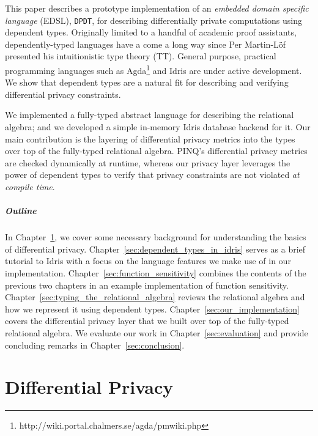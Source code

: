 \documentclass[12pt]{report}
\begin{document}
This paper describes a prototype implementation of an \textit{embedded domain specific language} (EDSL), \texttt{DPDT}, for describing differentially private computations using dependent types.
Originally limited to a handful of academic proof assistants, dependently-typed languages have a come a long way since Per Martin-L\"of presented his intuitionistic type theory (TT)\cite{mlitt}.
General purpose, practical programming languages such as Agda\footnote{http://wiki.portal.chalmers.se/agda/pmwiki.php} and Idris are under active development.
We show that dependent types are a natural fit for describing and verifying differential privacy constraints.

We implemented a fully-typed abstract language for describing the relational algebra; and we developed a simple in-memory Idris database backend for it.
Our main contribution is the layering of differential privacy metrics into the types over top of the fully-typed relational algebra.
PINQ's differential privacy metrics are checked dynamically at runtime, whereas our privacy layer leverages the power of dependent types to verify that privacy constraints are not violated \textit{at compile time}.


\paragraph{Outline}

In Chapter~\ref{sec:differential_privacy}, we cover some necessary background for understanding the basics of differential privacy.
Chapter~\ref{sec:dependent_types_in_idris} serves as a brief tutorial to Idris with a focus on the language features we make use of in our implementation.
Chapter~\ref{sec:function_sensitivity} combines the contents of the previous two chapters in an example implementation of function sensitivity.
Chapter~\ref{sec:typing_the_relational_algebra} reviews the relational algebra and how we represent it using dependent types.
Chapter~\ref{sec:our_implementation} covers the differential privacy layer that we built over top of the fully-typed relational algebra.
We evaluate our work in Chapter~\ref{sec:evaluation} and provide concluding remarks in Chapter~\ref{sec:conclusion}.

\chapter{Differential Privacy}\label{sec:differential_privacy}
\end{document}
